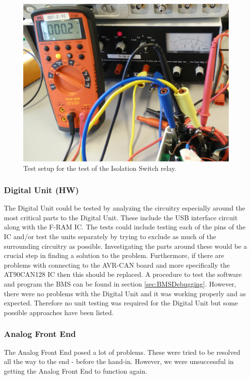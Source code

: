 \begin{figure}[H]
	\centering
	\includegraphics[width=1.0\linewidth]{Hardware/Pictures/BMSIsoTest}
	\caption[Empty]{Test setup for the test of the Isolation Switch relay.}
	\label{fig:BMSIsoTest}
\end{figure}


\subsubsection{Digital Unit (HW)}
The Digital Unit could be tested by analyzing the circuitry especially around the most critical parts to the Digital Unit. These include the USB interface circuit along with the F-RAM IC. The tests could include testing each of the pins of the IC and/or test the units separately by trying to exclude as much of the surrounding circuitry as possible. Investigating the parts around these would be a crucial step in finding a solution to the problem. Furthermore, if there are problems with connecting to the AVR-CAN board and more specifically the AT90CAN128 IC then this should be replaced. A procedure to test the software and program the BMS can be found in section \vref{sec:BMSDebugging}. However, there were no problems with the Digital Unit and it was working properly and as expected. Therefore no unit testing was required for the Digital Unit but some possible approaches have been listed. 

\subsubsection{Analog Front End}
The Analog Front End posed a lot of problems. These were tried to be resolved all the way to the end - before the hand-in. However, we were unsuccessful in getting the Analog Front End to function again.\\

